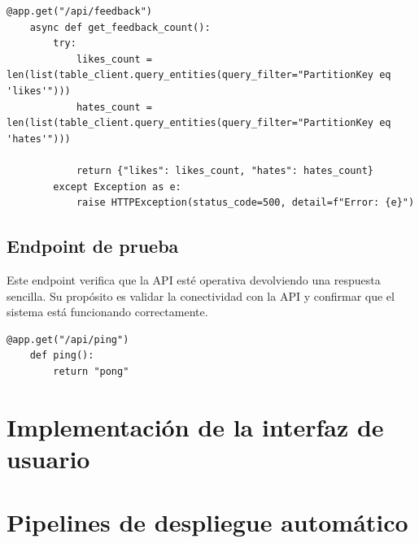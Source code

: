 \begin{lstlisting}[label=cod:api-3,caption=Endpoint de consulta de feedback.]
	@app.get("/api/feedback")
	async def get_feedback_count():
		try:
			likes_count = len(list(table_client.query_entities(query_filter="PartitionKey eq 'likes'")))
			hates_count = len(list(table_client.query_entities(query_filter="PartitionKey eq 'hates'")))
	
			return {"likes": likes_count, "hates": hates_count}
		except Exception as e:
			raise HTTPException(status_code=500, detail=f"Error: {e}")	
\end{lstlisting}

\subsection{Endpoint de prueba}

Este endpoint verifica que la API esté operativa devolviendo una respuesta sencilla. Su propósito es 
validar la conectividad con la API y confirmar que el sistema está funcionando correctamente.

\begin{lstlisting}[label=cod:api-4,caption=Endpoint de prueba.]
	@app.get("/api/ping")
	def ping():
		return "pong"
\end{lstlisting}

\section{Implementación de la interfaz de usuario}

\section{Pipelines de despliegue automático}